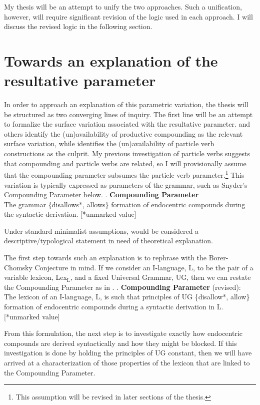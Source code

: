 \documentclass[letterpaper,12pt]{article}
\begin{document}
My thesis will be an attempt to unify the two approaches. 
Such a unification, however, will require significant revision of the logic used in each approach.
I will discuss the revised logic in the following section.


\section{Towards an explanation of the resultative parameter}\label{sec:outline}
In order to approach an explanation of this parametric variation, the thesis will be structured as two converging lines of inquiry.
The first line will be an attempt to formalize the surface variation associated with the resultative parameter.
\textcite{snyder2001nature,roeper2002learnability,kratzer_building_2004} and others identify the (un)availability of productive compounding as the relevant surface variation, while \textcite{haider2016predicting} identifies the (un)availability of particle verb constructions as the culprit.
My previous investigation of particle verbs \parencite[][included as an appendix]{milway2013forum} suggests that compounding and particle verbs are related, so I will provisionally assume that the compounding parameter subsumes the particle verb parameter.\footnote{
  This assumption will be revised in later sections of the thesis.
}
This variation is typically expressed as parameters of the grammar, such as Snyder's Compounding Parameter below.
\ex. \textbf{Compounding Parameter} \parencite{snyder2001nature}\\ 
The grammar \{disallows*, allows\} formation of endocentric compounds during the syntactic derivation. [*unmarked value] 

Under standard minimalist assumptions, \Last would be considered a descriptive/typological statement in need of theoretical explanation.

The first step towards such an explanation is to rephrase \Last with the Borer-Chomsky Conjecture in mind.
If we consider an I-language, L, to be the pair of a variable lexicon, Lex$_\text{L}$, and a fixed Universal Grammar, UG, then we can restate the Compounding Parameter as in \Next.
\ex. \textbf{Compounding Parameter} (revised):\\
The lexicon of an I-language, L, is such that principles of UG \{disallow*, allow\} formation of endocentric compounds during a syntactic derivation in L. [*unmarked value]

From this formulation, the next step is to investigate exactly how endocentric compounds are derived syntactically and how they might be blocked.
If this investigation is done by holding the principles of UG constant, then we will have arrived at a characterization of those properties of the lexicon that are linked to the Compounding Parameter.
\end{document}
